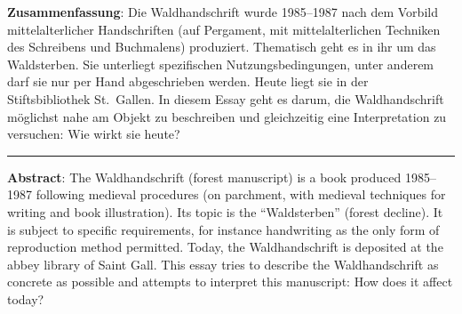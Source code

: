 \textbf{Zusammenfassung}: Die Waldhandschrift wurde 1985--1987 nach dem
Vorbild mittelalterlicher Handschriften (auf Pergament, mit
mittelalterlichen Techniken des Schreibens und Buchmalens) produziert.
Thematisch geht es in ihr um das Waldsterben. Sie unterliegt
spezifischen Nutzungsbedingungen, unter anderem darf sie nur per Hand
abgeschrieben werden. Heute liegt sie in der Stiftsbibliothek
St.~Gallen. In diesem Essay geht es darum, die Waldhandschrift möglichst
nahe am Objekt zu beschreiben und gleichzeitig eine Interpretation zu
versuchen: Wie wirkt sie heute?

\begin{center}\rule{0.5\linewidth}{0.5pt}\end{center}

\textbf{Abstract}: The Waldhandschrift (forest manuscript) is a book
produced 1985--1987 following medieval procedures (on parchment, with
medieval techniques for writing and book illustration). Its topic is the
“Waldsterben” (forest decline). It is subject to specific
requirements, for instance handwriting as the only form of reproduction
method permitted. Today, the Waldhandschrift is deposited at the abbey
library of Saint Gall. This essay tries to describe the Waldhandschrift
as concrete as possible and attempts to interpret this manuscript: How
does it affect today?
